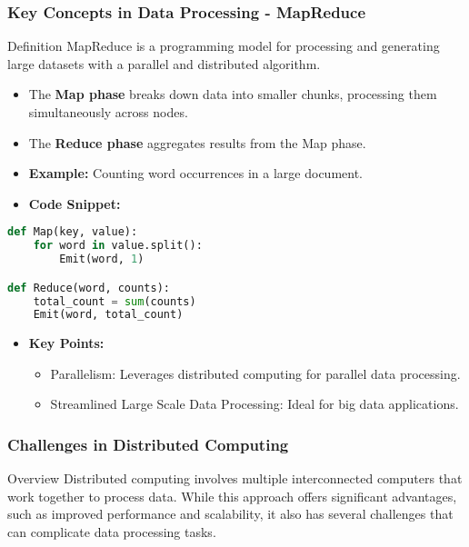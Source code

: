 \documentclass[aspectratio=169]{beamer}
\begin{document}
\begin{frame}[fragile]
    \frametitle{Key Concepts in Data Processing - MapReduce}
    \begin{block}{Definition}
        MapReduce is a programming model for processing and generating large datasets with a parallel and distributed algorithm.
    \end{block}
    \begin{itemize}
        \item The \textbf{Map phase} breaks down data into smaller chunks, processing them simultaneously across nodes.
        \item The \textbf{Reduce phase} aggregates results from the Map phase.
        \item \textbf{Example:} Counting word occurrences in a large document.
        \item \textbf{Code Snippet:}
        \end{itemize}
        \begin{lstlisting}[language=Python]
def Map(key, value):
    for word in value.split():
        Emit(word, 1)

def Reduce(word, counts):
    total_count = sum(counts)
    Emit(word, total_count)
        \end{lstlisting}
    \begin{itemize}
        \item \textbf{Key Points:}
        \begin{itemize}
            \item Parallelism: Leverages distributed computing for parallel data processing.
            \item Streamlined Large Scale Data Processing: Ideal for big data applications.
        \end{itemize}
    \end{itemize}
\end{frame}

\begin{frame}[fragile]
    \frametitle{Challenges in Distributed Computing}
    \begin{block}{Overview}
        Distributed computing involves multiple interconnected computers that work together to process data. While this approach offers significant advantages, such as improved performance and scalability, it also has several challenges that can complicate data processing tasks.
    \end{block}
\end{frame}
\end{document}
